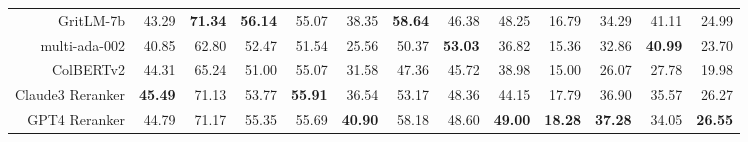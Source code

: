 \begin{table}[t]
{\begin{tabular}{r|rrrr|rrrr|rrrr}
        GritLM-7b & 43.29 & \textbf{71.34} & \textbf{56.14} & 55.07 & 38.35 & \textbf{58.64} & 46.38 & 48.25 & 16.79 & 34.29 & 41.11 & 24.99 \\
        multi-ada-002 & 40.85 & 62.80 & 52.47 & 51.54 & 25.56 & 50.37 & \textbf{53.03} & 36.82 & 15.36 & 32.86 & \textbf{40.99} & 23.70 \\
        ColBERTv2 & 44.31 & 65.24 & 51.00 & 55.07 & 31.58 & 47.36 & 45.72 & 38.98 & 15.00 & 26.07 & 27.78 & 19.98 \\
        Claude3 Reranker & \textbf{45.49} & 71.13 & 53.77 & \textbf{55.91} & 36.54 & 53.17 & 48.36 & 44.15 & 17.79 & 36.90 & 35.57 & 26.27 \\
        GPT4 Reranker & 44.79 & 71.17 & 55.35 & 55.69 & \textbf{40.90} & 58.18 & 48.60 & \textbf{49.00} & \textbf{18.28} & \textbf{37.28} & 34.05 & \textbf{26.55} \\
        \bottomrule
    \end{tabular}
    }
    \label{tab:results}
\end{table}
